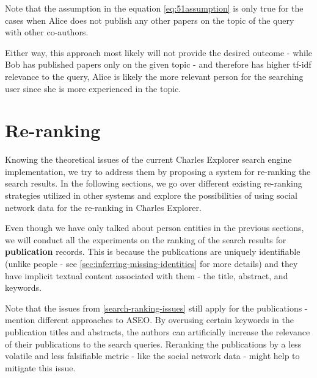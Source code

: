 Note that the assumption in the equation \ref{eq:51assumption} is only true for the cases when Alice does not publish any other papers on the topic of the query with other co-authors.


Either way, this approach most likely will not provide the desired outcome - while Bob has published papers only on the given topic - and therefore has higher tf-idf relevance to the query,
Alice is likely the more relevant person for the searching user since she is more experienced in the topic.

\section{Re-ranking}

Knowing the theoretical issues of the current Charles Explorer search engine implementation, we try to address them by proposing a system for re-ranking the search results.
In the following sections, we go over different existing re-ranking strategies utilized in other systems and explore the possibilities of using social network data 
for the re-ranking in Charles Explorer.

Even though we have only talked about person entities in the previous sections, we will conduct all the experiments
on the ranking of the search results for \textbf{publication} records.
This is because the publications are uniquely identifiable (unlike people - see \ref{sec:inferring-missing-identities} for more details) 
and they have implicit textual content associated with them - the title, abstract, and keywords.

Note that the issues from \ref{search-ranking-issues} still apply for the publications - \cite{aseo} mention different approaches to \ac{ASEO}.
By overusing certain keywords in the publication titles and abstracts, the authors can artificially increase the relevance of their publications to the search queries.
Reranking the publications by a less volatile and less falsifiable metric - like the social network data - might help to mitigate this issue.

